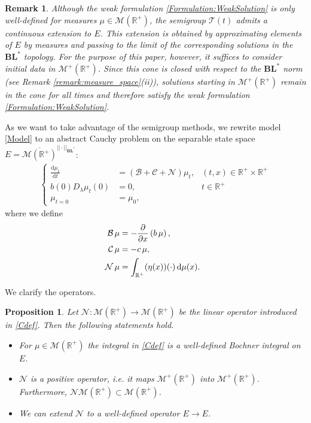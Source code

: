 \documentclass[12pt,a4paper]{amsart}
\newcommand{\ud}{\mathrm{d}}
\newtheorem{proposition}[theorem]{Proposition}
\newtheorem{remark}[theorem]{Remark}
\newcommand{\BLN}{\mathbf{BL}}
\newcommand{\R}{\mathbb{R}}
\begin{document}
\begin{remark}
Although the weak formulation \eqref{Formulation:WeakSolution} is only well-defined for measures $\mu\in\mathcal{M}(\R^+)$, the semigroup $\mathcal{T}(t)$ admits a continuous extension to $E$. This extension is obtained by approximating elements of $E$ by measures and passing to the limit of the corresponding solutions in the $\BLN^*$ topology. For the purpose of this paper, however, it suffices to consider initial data in $\mathcal{M}^+(\R^+)$. Since this cone is closed with respect to the $\BLN^*$ norm (see Remark \ref{remark:measure_space}(ii)), solutions starting in $\mathcal{M}^+(\R^+)$ remain in the cone for all times and therefore satisfy the weak formulation \eqref{Formulation:WeakSolution}.
 \end{remark}

\noindent As we want to take advantage of the semigroup methods, we rewrite model \eqref{Model} to an abstract Cauchy problem on the separable state space $E=\overline{\mathcal{M}(\mathbb{R}^+)}^{||\cdot ||_{\BLN^*}}$:
    \begin{align}\label{Cauchy}
    \left\{
    \begin{array}{lll}
    \frac{\ud \mu_t}{\ud t}&=\left(\mathcal{B}+\mathcal{C}+\mathcal{N}\right)\mu_t,&(t,x)\in\R^+\times\R^+\\
    b(0)D_{\lambda}\mu_t(0)&= 0,&t\in \R^+\\
    \mu_{t=0}&=\mu_0,
    \end{array}
    \right.
    \end{align}
where we define
\begin{align}
\mathcal{B}\,\mu&=-\frac{\partial}{\partial x}\left(b\,\mu\right),  \hspace{15mm}  \label{Adef} \\
\mathcal{C}\,\mu&=-c\,\mu,  \\
\mathcal{N}\,\mu&=\int_{\mathbb{R}^+}(\eta(x))(\cdot)\,\ud \mu(x).\label{Cdef}
\end{align}

\noindent We clarify the operators.
\begin{proposition}
\label{prop:N_well-posed}
Let $\mathcal{N}:\mathcal{M}(\R^+)\to\mathcal{M}(\R^+)$ be the linear operator introduced in \eqref{Cdef}. Then the following statements hold.
    \begin{itemize}
        \item [i)] For $\mu\in \mathcal{M}(\R^+)$ the integral in \eqref{Cdef} is a well-defined Bochner integral on $E$.
        \item[ii)] $\mathcal{N}$ is a positive operator, i.e. it maps $\mathcal{M}^+(\R^+)$ into $\mathcal{M}^+(\R^+)$. Furthermore, $\mathcal{N}\mathcal{M}(\R^+)\subset\mathcal{M}(\R^+)$.
        \item [iii)] We can extend $\mathcal{N}$ to a well-defined operator $E\to E$.
    \end{itemize}
\end{proposition}
\end{document}
